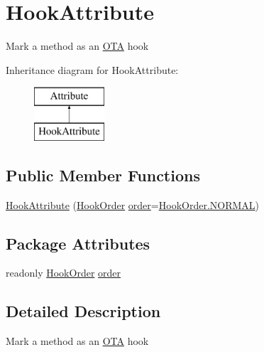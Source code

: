 \hypertarget{classOTA_1_1Plugin_1_1HookAttribute}{}\section{Hook\+Attribute}
\label{classOTA_1_1Plugin_1_1HookAttribute}


Mark a method as an \hyperlink{namespaceOTA}{O\+T\+A} hook  


Inheritance diagram for Hook\+Attribute\+:\begin{figure}[H]
\begin{center}
\leavevmode
\includegraphics[height=2.000000cm]{classOTA_1_1Plugin_1_1HookAttribute}
\end{center}
\end{figure}
\subsection*{Public Member Functions}
\begin{DoxyCompactItemize}
\item 
\hyperlink{classOTA_1_1Plugin_1_1HookAttribute_acc22fda1fa36dc19783c81131b61478f}{Hook\+Attribute} (\hyperlink{namespaceOTA_1_1Plugin_a7c65b8c7c155fec0b559afbe2da809c0}{Hook\+Order} \hyperlink{classOTA_1_1Plugin_1_1HookAttribute_a4e1b34207820eb484e70789d62e0c83d}{order}=\hyperlink{namespaceOTA_1_1Plugin_a7c65b8c7c155fec0b559afbe2da809c0a1e23852820b9154316c7c06e2b7ba051}{Hook\+Order.\+N\+O\+R\+M\+A\+L})
\end{DoxyCompactItemize}
\subsection*{Package Attributes}
\begin{DoxyCompactItemize}
\item 
readonly \hyperlink{namespaceOTA_1_1Plugin_a7c65b8c7c155fec0b559afbe2da809c0}{Hook\+Order} \hyperlink{classOTA_1_1Plugin_1_1HookAttribute_a4e1b34207820eb484e70789d62e0c83d}{order}
\end{DoxyCompactItemize}


\subsection{Detailed Description}
Mark a method as an \hyperlink{namespaceOTA}{O\+T\+A} hook 



